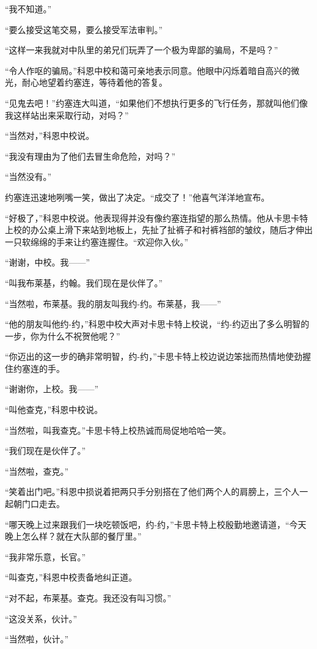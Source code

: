     “我不知道。”

    “要么接受这笔交易，要么接受军法审判。”

    “这样一来我就对中队里的弟兄们玩弄了一个极为卑鄙的骗局，不是吗？”

    “令人作呕的骗局。”科恩中校和蔼可亲地表示同意。他眼中闪烁着暗自高兴的微光，耐心地望着约塞连，等待着他的答复。

    “见鬼去吧！”约塞连大叫道，“如果他们不想执行更多的飞行任务，那就叫他们像我这样站出来采取行动，对吗？”

    “当然对，”科恩中校说。

    “我没有理由为了他们去冒生命危险，对吗？”

    “当然没有。”

    约塞连迅速地咧嘴一笑，做出了决定。“成交了！”他喜气洋洋地宣布。

    “好极了，”科恩中校说。他表现得并没有像约塞连指望的那么热情。他从卡思卡特上校的办公桌上滑下来站到地板上，先扯了扯裤子和衬裤裆部的皱纹，随后才伸出一只软绵绵的手来让约塞连握住。“欢迎你入伙。”

    “谢谢，中校。我——”

    “叫我布莱基，约翰。我们现在是伙伴了。”

    “当然啦，布莱基。我的朋友叫我约-约。布莱基，我——”

    “他的朋友叫他约-约，”科恩中校大声对卡思卡特上校说，“约-约迈出了多么明智的一步，你为什么不祝贺他呢？”

    “你迈出的这一步的确非常明智，约-约，”卡思卡特上校边说边笨拙而热情地使劲握住约塞连的手。

    “谢谢你，上校。我——”

    “叫他查克，”科恩中校说。

    “当然啦，叫我查克。”卡思卡特上校热诚而局促地哈哈一笑。

    “我们现在是伙伴了。”

    “当然啦，查克。”

    “笑着出门吧。”科恩中损说着把两只手分别搭在了他们两个人的肩膀上，三个人一起朝门口走去。

    “哪天晚上过来跟我们一块吃顿饭吧，约-约，”卡思卡特上校殷勤地邀请道，“今天晚上怎么样？就在大队部的餐厅里。”

    “我非常乐意，长官。”

    “叫查克，”科恩中校责备地纠正道。

    “对不起，布莱基。查克。我还没有叫习惯。”

    “这没关系，伙计。”

    “当然啦，伙计。”

